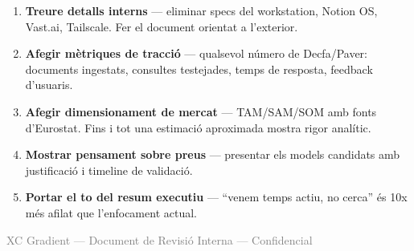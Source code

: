 \documentclass[11pt,a4paper]{article}
\begin{document}
\begin{enumerate}[leftmargin=1.5em]
\item \textbf{Treure detalls interns} --- eliminar specs del workstation, Notion OS, Vast.ai, Tailscale. Fer el document orientat a l'exterior.
\item \textbf{Afegir mètriques de tracció} --- qualsevol número de Decfa/Paver: documents ingestats, consultes testejades, temps de resposta, feedback d'usuaris.
\item \textbf{Afegir dimensionament de mercat} --- TAM/SAM/SOM amb fonts d'Eurostat. Fins i tot una estimació aproximada mostra rigor analític.
\item \textbf{Mostrar pensament sobre preus} --- presentar els models candidats amb justificació i timeline de validació.
\item \textbf{Portar el to del resum executiu} --- ``venem temps actiu, no cerca'' és 10x més afilat que l'enfocament actual.
\end{enumerate}

\vfill
\begin{center}
\small\textcolor{gray}{XC Gradient --- Document de Revisió Interna --- Confidencial}
\end{center}
\end{document}
